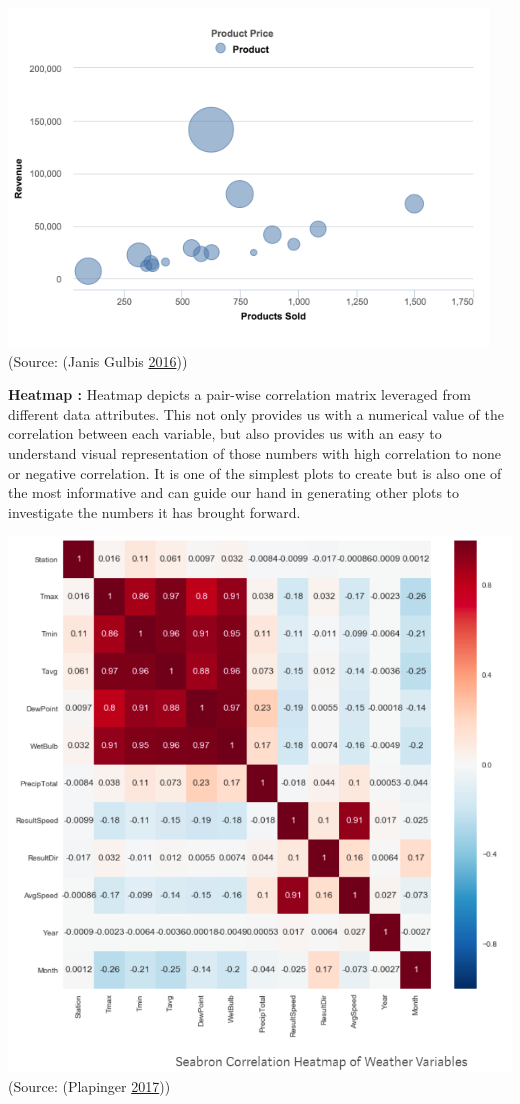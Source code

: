 \documentclass[]{book}
\begin{document}
\includegraphics{images/3.2.2_Bubble_chart.png}
(Source: (Janis Gulbis \protect\hyperlink{ref-DataVisualization_charts}{2016}))

\textbf{Heatmap :} Heatmap depicts a pair-wise correlation matrix leveraged from different data attributes. This not only provides us with a numerical value of the correlation between each variable, but also provides us with an easy to understand visual representation of those numbers with high correlation to none or negative correlation. It is one of the simplest plots to create but is also one of the most informative and can guide our hand in generating other plots to investigate the numbers it has brought forward.

\includegraphics{images/3.2.2_Heat_map.png}
(Source: (Plapinger \protect\hyperlink{ref-Visualizing_DataAnalysis}{2017}))
\end{document}

